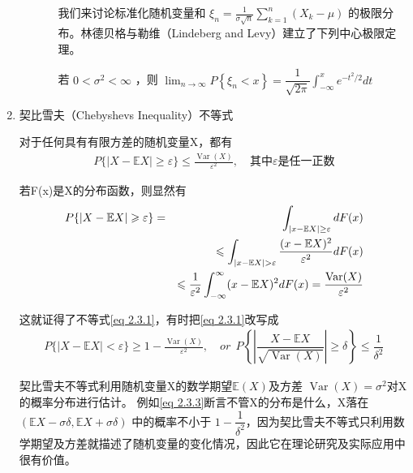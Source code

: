 \begin{enumerate}[1]
\begin{enumerate}[1)]
\begin{enumerate}[ a) ]
						我们来讨论标准化随机变量和 $ \xi_{n}=\frac{1}{\sigma \sqrt{n}} 
						\sum_{k=1}^{n}\left(X_{k}-\mu\right) $ 的极限分布。林德贝格与勒维（Lindeberg and Levy）建立了下列中心极限定理。
						
						\begin{theorem}[林德贝格-勒维]
							若 $ 0< \sigma^{2} < \infty $ ，则
							$ \lim _{n \rightarrow \infty} P\left\{\xi_{n}<x\right\}=\dfrac{1}{\sqrt{2 \pi}} \int_{-\infty}^{x} e^{-t^{2} / 2} d t $
						\end{theorem}
					\end{enumerate}
			\end{enumerate}
	   \item 契比雪夫（Chebyshevs Inequality）不等式
	    \setlength{\parindent}{2\ccwd}
	    
		   对于任何具有有限方差的随机变量X，都有
		   \begin{eqnarray}
		   P\{|X-\mathbb{E} X| \geqslant \varepsilon\} \leqslant \frac{\operatorname{Var}(X)}{\varepsilon^{2}}, \quad 
		   \text{其中}  \varepsilon   \text{是任一正数} \label{eq 2.3.1}
		   \end{eqnarray}
		   
		   \begin{myproof}
				若F(x)是X的分布函数，则显然有
				\begin{eqnarray}
				P\{|X-\mathbb{E} X|\geqslant \varepsilon\} & =  &\int_{|x- \mathbb{E} X| \geq \varepsilon} d F(x) \vspace{0.5em} \notag \\
				& &\leqslant \int_{|x-\mathbb{E} X|>\varepsilon} \frac{(x-\mathbb{E} X)^{2}}{\varepsilon^{2}} d F(x) \vspace{0.5em}  \\
				& &\leqslant \frac{1}{\varepsilon^{2}} \int_{-\infty}^{\infty}(x-\mathbb{E} X)^{2} d F(x)  
				= \frac{\operatorname{Var}(X)}{\varepsilon^{2}} \notag
				\end{eqnarray}
		   \end{myproof}
		   这就证得了不等式\eqref{eq 2.3.1}，有时把\eqref{eq 2.3.1}改写成
		   \begin{eqnarray}
		   P\{|X-\mathbb{E} X|<\varepsilon\} \geqslant 1-\frac{\operatorname{Var}(X)}{\varepsilon^{2}}, \quad
		   or  \ \ 
		   P \left\{\left |  \dfrac{X-\mathbb{E} X}{\sqrt{\operatorname{Var}(X)} }\right |  \geq \delta\right\} \leqslant \dfrac{1}{\delta^{2}}  \label{eq 2.3.3} 
		   \end{eqnarray}
		   
		   契比雪夫不等式利用随机变量X的数学期望$ \mathbb{E}(X) $及方差 $\operatorname{Var}(X)=\sigma^{2}$对X的概率分布进行估计。
		   例如\eqref{eq 2.3.3}断言不管X的分布是什么，X落在$ ( \mathbb{E} X-\sigma \delta, \mathbb{E} X+\sigma \delta) $ 中的概率不小于 
		   $ 1-\dfrac{1}{\delta^{2}} $，因为契比雪夫不等式只利用数学期望及方差就描述了随机变量的变化情况，因此它在理论研究及实际应用中很有价值。
		   

\end{enumerate}
